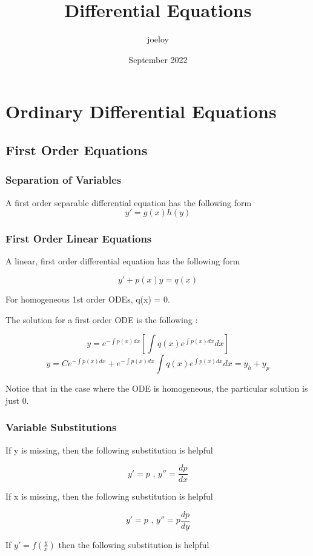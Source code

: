 \documentclass{article}
\title{Differential Equations}
\author{joeloy}
\date{September 2022}
\begin{document}
\maketitle

\section{Ordinary Differential Equations}

\subsection{First Order Equations}

\subsubsection{Separation of Variables}
A first order separable differential equation has the following form
$$ y' = g(x)h(y) $$

\subsubsection{First Order Linear Equations}

A linear, first order differential equation has the following form 

$$ y' + p(x)y = q(x) $$

For homogeneous 1st order ODEs, q(x) = 0. 

The solution for a first order ODE is the following :

$$ y = e^{-\int{p(x)dx}}\left[\int{q(x) e^{\int{p(x)dx}}dx}\right] $$ 
$$ y = Ce^{-\int{p(x)dx}} + e^{-\int{p(x)dx}}\int{q(x) e^{\int{p(x)dx}}dx} = y_h + y_p$$

Notice that in the case where the ODE is homogeneous, the particular solution is just 0.

\subsubsection{Variable Substitutions}

If y is missing, then the following substitution is helpful 

$$ y' = p \text{ , }  y'' = \frac{dp}{dx} $$

If x is missing, then the following substitution is helpful

$$ y' = p \text{ , } y'' = p\frac{dp}{dy} $$

If $ y' = f(\frac{y}{x}) $ then the following substitution is helpful
\end{document}

